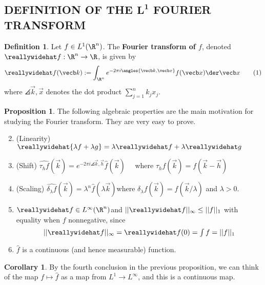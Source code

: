 \documentclass[a5paper]{article}
\theoremstyle{definition}%
\newtheorem{corollary}[theorem]{Corollary}
\newtheorem{proposition}[theorem]{Proposition}
\newtheorem*{definition*}{Definition}
\numberwithin{exercise}{section}
\theoremstyle{remark}%
\begin{document}
\subsection{DEFINITION OF THE $\mathbf{L^1}$ FOURIER
TRANSFORM}
\begin{highlight}
\begin{definition*}
Let $f\in L^1(\R^n)$. The \textbf{Fourier transform of $f$}, denoted $\hat{f}:\R^n\to \R$, is given by 
\begin{equation}
\hat{f}(\vec k):=\int_{\R^n} e^{-2\pi i \angles{\vec k,\vec x}} f(\vec x)\der \vec x\tag{$1$}
\end{equation}
where $\angles{\vec k, \vec x}$ denotes the dot product $\sum_{j=1}^n k_j x_j$. 
\end{definition*}
\end{highlight}

\begin{highlight}
\begin{proposition}
The following algebraic properties are the main motivation for studying
the Fourier transform. They are very easy to prove.
\begin{enumerate}[label=(\arabic*)]
	\setcounter{enumi}{1}
	\item (Linearity) $\reallywidehat{\lambda f+\lambda g}=\lambda\hat{f}+\lambda\hat{g}$
	\item (Shift) $\widehat{\tau_h f}(\vec{k})=e^{-2\pi i\angles{\vec{k}, \vec{h}}} \hat{f} (\vec{k}) \quad$ where \quad${\tau_h f}(\vec{k})=f(\vec{k}-\vec{h})$
	\item (Scaling) $\widehat{\delta_\lambda f}(\vec{k}) = \lambda^n \hat{f}(\lambda \vec{k}) $\quad where \quad $\delta_\lambda f(\vec{k}) = f(\vec{k}/\lambda)$ and $\lambda>0$.
	\item $\hat{f} \in L^\infty(\R^n)$\quad and \quad $ ||{\hat{f}}||_\infty\leq\norm{f}_1$ with equality when $f$ nonnegative, since 
	$$||{\hat{f}}||_\infty = \hat{f}(0) = \textstyle\int f = \norm{f}_1$$
	\item $\hat{f}$ is a continuous (and hence measurable) function.
\end{enumerate}
\end{proposition}
\end{highlight}

\begin{corollary}
By the fourth conclusion in the previous proposition, we can think of the map $f\mapsto\hat{f}$ as a map from $L^1\to L^\infty$, and this is a continuous map. 
\end{corollary}
\end{document}
